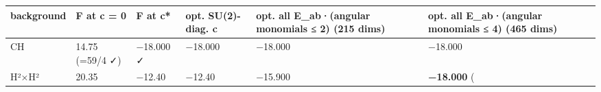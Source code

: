 \documentclass[
  10pt,
]{report}
\begin{document}
\begin{longtable}[]{@{}llllll@{}}
\toprule
\begin{minipage}[b]{0.14\columnwidth}\raggedright
background\strut
\end{minipage} & \begin{minipage}[b]{0.14\columnwidth}\raggedright
F at c = 0\strut
\end{minipage} & \begin{minipage}[b]{0.14\columnwidth}\raggedright
F at c*\strut
\end{minipage} & \begin{minipage}[b]{0.14\columnwidth}\raggedright
opt. SU(2)-diag. c\strut
\end{minipage} & \begin{minipage}[b]{0.14\columnwidth}\raggedright
opt. all E\_ab·(angular monomials ≤ 2) (215 dims)\strut
\end{minipage} & \begin{minipage}[b]{0.14\columnwidth}\raggedright
opt. all E\_ab·(angular monomials ≤ 4) (465 dims)\strut
\end{minipage}\tabularnewline
\midrule
\endhead
\begin{minipage}[t]{0.14\columnwidth}\raggedright
CH\strut
\end{minipage} & \begin{minipage}[t]{0.14\columnwidth}\raggedright
14.75 (=59/4 ✓)\strut
\end{minipage} & \begin{minipage}[t]{0.14\columnwidth}\raggedright
−18.000 ✓\strut
\end{minipage} & \begin{minipage}[t]{0.14\columnwidth}\raggedright
−18.000\strut
\end{minipage} & \begin{minipage}[t]{0.14\columnwidth}\raggedright
−18.000\strut
\end{minipage} & \begin{minipage}[t]{0.14\columnwidth}\raggedright
−18.000\strut
\end{minipage}\tabularnewline
\begin{minipage}[t]{0.14\columnwidth}\raggedright
H²×H²\strut
\end{minipage} & \begin{minipage}[t]{0.14\columnwidth}\raggedright
20.35\strut
\end{minipage} & \begin{minipage}[t]{0.14\columnwidth}\raggedright
−12.40\strut
\end{minipage} & \begin{minipage}[t]{0.14\columnwidth}\raggedright
−12.40\strut
\end{minipage} & \begin{minipage}[t]{0.14\columnwidth}\raggedright
−15.900\strut
\end{minipage} & \begin{minipage}[t]{0.14\columnwidth}\raggedright
\textbf{−18.000} (\strut
\end{minipage}\tabularnewline
\bottomrule
\end{longtable}
\end{document}
